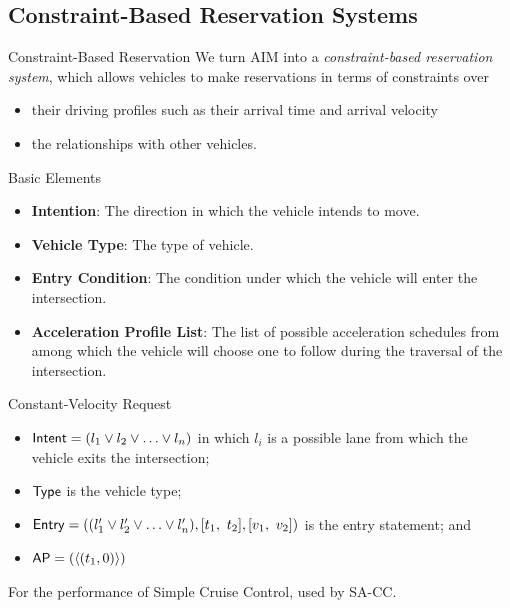 \documentclass{beamer}
\begin{document}
\subsection{Constraint-Based Reservation Systems}

\begin{frame}{Constraint-Based Reservation}
We turn AIM into a \emph{constraint-based reservation system}, which
allows vehicles to make reservations in terms of constraints over
\begin{itemize}
\item their driving profiles such as their arrival time and arrival velocity
\item the relationships with other vehicles.
\end{itemize}
\end{frame}

\begin{frame}{Basic Elements}
\begin{itemize}
\item{\bf Intention}: The direction in which the vehicle intends to
move.\pause
\item{\bf Vehicle Type}: The type of vehicle.\pause
\item{\bf Entry Condition}: The condition under which the vehicle will
enter the intersection.\pause
\item{\bf Acceleration Profile List}: The list of possible
acceleration schedules from among which the vehicle will choose one to
follow during the traversal of the intersection.
\end{itemize}
\end{frame}

\begin{frame}{Constant-Velocity Request}
\begin{itemize}
\item ${\sf Intent} = ( l_1 \vee l_2 \vee \ldots \vee l_n )$
in which $l_i$ is a possible lane from which the vehicle 
exits the intersection;
\item ${\sf Type}$ is the vehicle type;
\item ${\sf Entry} = (( l'_1 \vee l'_2 \vee \ldots \vee l'_n ), [t_1,\ t_2], [v_1,\ v_2])$
is the entry statement; and
\item ${\sf AP} = ( \langle (t_1, 0) \rangle )$
\end{itemize}

For the performance of Simple Cruise Control, used by SA-CC.
\end{frame}
\end{document}
